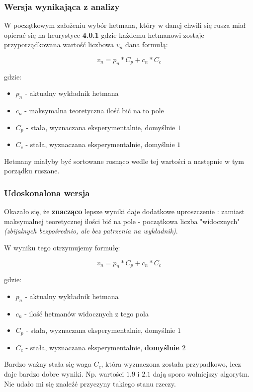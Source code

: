 \documentclass{article}
\begin{document}
\subsubsection{Wersja wynikająca z analizy}

W początkowym założeniu wybór hetmana, który w danej chwili się rusza miał opierać się na heurystyce \textbf{4.0.1} gdzie każdemu hetmanowi zostaje przyporządkowana wartość liczbowa $v_n$ dana formułą:

$$v_n=p_n*C_p+c_n*C_c$$

gdzie:
\begin{itemize}
\item $p_n$ - aktualny wykładnik hetmana
\item $c_n$ - maksymalna teoretyczna ilość bić na to pole
\item $C_p$ - stała, wyznaczana eksperymentalnie, domyślnie $1$
\item $C_c$ - stała, wyznaczana eksperymentalnie, domyślnie $1$
\end{itemize}

Hetmany miałyby być sortowane rosnąco wedle tej wartości a następnie w tym porządku ruszane.

\subsubsection{Udoskonalona wersja}

Okazało się, że \textbf{znacząco} lepsze wyniki daje dodatkowe uproszczenie : zamiast maksymalnej teoretycznej ilości bić na pole - początkowa liczba "widocznych" \textit{(zbijalnych bezpośrednio, ale bez patrzenia na wykładnik)}.

W wyniku tego otrzymujemy formułę:

$$v_n=p_n*C_p+c_n*C_c$$

gdzie:
\begin{itemize}
\item $p_n$ - aktualny wykładnik hetmana
\item $c_n$ - ilość hetmanów widocznych z tego pola
\item $C_p$ - stała, wyznaczana eksperymentalnie, domyślnie $1$
\item $C_c$ - stała, wyznaczana eksperymentalnie, \textbf{domyślnie $2$}
\end{itemize}

Bardzo ważny stała się waga $C_c$, która wyznaczona została przypadkowo, lecz daje bardzo dobre wyniki. Np. wartości $1.9$ i $2.1$ dają sporo wolniejszy algorytm. Nie udało mi się znaleźć przyczyny takiego stanu rzeczy.
\end{document}
